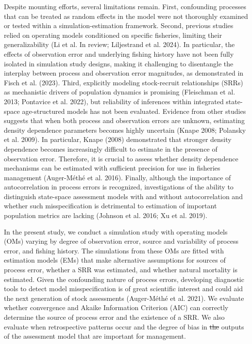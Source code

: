 \documentclass[
  12pt,
]{article}
\makeatletter
\providecommand{\DIFdel}[1]{{\protect\color{red}\sout{#1}}} %
\providecommand{\DIFaddbegin}{} %
\providecommand{\DIFaddend}{} %
\providecommand{\DIFdelbegin}{} %
\providecommand{\DIFdelend}{} %
\newcommand{\DIFscaledelfig}{0.5}
\newlength{\DIFdelgraphicswidth} %
\newlength{\DIFdelgraphicsheight} %
\newcommand{\DIFaddincludegraphics}[2][]{{\color{blue}\fbox{\DIFOincludegraphics[#1]{#2}}}} %
\newcommand{\DIFdelincludegraphics}[2][]{%
\sbox{\DIFdelgraphicsbox}{\DIFOincludegraphics[#1]{#2}}%
\settoboxwidth{\DIFdelgraphicswidth}{\DIFdelgraphicsbox} %
\settoboxtotalheight{\DIFdelgraphicsheight}{\DIFdelgraphicsbox} %
\scalebox{\DIFscaledelfig}{%
\parbox[b]{\DIFdelgraphicswidth}{\usebox{\DIFdelgraphicsbox}\\[-\baselineskip] \rule{\DIFdelgraphicswidth}{0em}}\llap{\resizebox{\DIFdelgraphicswidth}{\DIFdelgraphicsheight}{%
\setlength{\unitlength}{\DIFdelgraphicswidth}%
\begin{picture}(1,1)%
\thicklines\linethickness{2pt} %
{\color[rgb]{1,0,0}\put(0,0){\framebox(1,1){}}}%
{\color[rgb]{1,0,0}\put(0,0){\line( 1,1){1}}}%
{\color[rgb]{1,0,0}\put(0,1){\line(1,-1){1}}}%
\end{picture}%
}\hspace*{3pt}}} %
} %
\DeclareRobustCommand{\DIFaddbegin}{\DIFOaddbegin \let\includegraphics\DIFaddincludegraphics} %
\DeclareRobustCommand{\DIFaddend}{\DIFOaddend \let\includegraphics\DIFOincludegraphics} %
\DeclareRobustCommand{\DIFdelbegin}{\DIFOdelbegin \let\includegraphics\DIFdelincludegraphics} %
\DeclareRobustCommand{\DIFdelend}{\DIFOaddend \let\includegraphics\DIFOincludegraphics} %
\let\sout@orig\sout %
\renewcommand{\sout}[1]{\ifmmode\text{\sout@orig{\ensuremath{#1}}}\else\sout@orig{#1}\fi} %
\makeatother
\begin{document}
Despite mounting efforts, several limitations remain. First, confounding
processes that can be treated as random effects in the model were not
thoroughly examined or tested within a simulation-estimation framework.
Second, previous studies relied on operating models conditioned on
specific fisheries, limiting their generalizability (Li et al. In
review; Liljestrand et al. 2024). In particular, the effects of
observation error and underlying fishing history have not been fully
isolated in simulation study designs, making it challenging to
disentangle the interplay between process and observation error
magnitudes, as demonstrated in Fisch et al. (2023). Third, explicitly
modeling stock-recruit relationships (SRRs) as mechanistic drivers of
population dynamics is promising (Fleischman et al. 2013; Pontavice et
al. 2022), but reliability of inferences within integrated state-space
age-structured models has not been evaluated. Evidence from other
studies suggests that when both process and observation errors are
unknown, estimating density dependence parameters becomes highly
uncertain (Knape 2008; Polansky et al. 2009). In particular, Knape
(2008) demonstrated that stronger density dependence becomes
increasingly difficult to estimate in the presence of observation error.
Therefore, it is crucial to assess whether density dependence mechanisms
can be estimated with sufficient precision for use in fisheries
management (Auger-Méthé et al. 2016). Finally, although the importance
of autocorrelation in process errors is recognized, investigations of
the ability to distinguish state-space assessment models with and
without autocorrelation and whether such misspecification is detrimental
to estimation of important population metrics are lacking (Johnson et
al. 2016; Xu et al. 2019).

In the present study, we conduct a simulation study with operating
models (OMs) varying by degree of observation error, source and
variability of process error, and fishing history. The simulations from
these OMs are fitted with estimation models (EMs) that make alternative
assumptions for sources of process error, whether a SRR was estimated,
and whether natural mortality is estimated. Given the confounding nature
of process errors, developing diagnostic tools to detect model
misspecification is of great scientific interest and could aid the next
generation of stock assessments (\DIFaddbegin {\DIFaddend Auger-Méthé et al.\DIFaddbegin } \DIFaddend 2021). We evaluate
whether convergence and Akaike Information Criterion (AIC) can correctly
determine the source of process error and the existence of a SRR. We
also evaluate when retrospective patterns occur and the degree of bias
in \DIFdelbegin \DIFdel{the }\DIFdelend outputs of the assessment model that are important for management.
\end{document}
